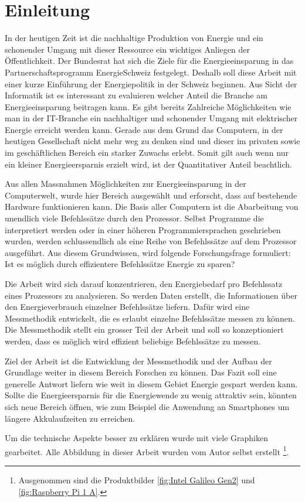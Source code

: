\chapter{Einleitung}


In der heutigen Zeit ist die nachhaltige Produktion von Energie und ein schonender Umgang mit dieser Ressource ein wichtiges Anliegen der Öffentlichkeit. Der Bundesrat hat sich die Ziele für die Energieeinsparung in das Partnerschaftsprogramm EnergieSchweiz festgelegt. Deshalb soll diese Arbeit mit einer kurze Einführung der Energiepolitik in der Schweiz beginnen. Aus Sicht der Informatik ist es interessant zu evaluieren welcher Anteil die Branche am Energieeinsparung beitragen kann. Es gibt bereits Zahlreiche Möglichkeiten wie man in der IT-Branche ein nachhaltiger und schonender Umgang mit elektrischer Energie erreicht werden kann. Gerade aus dem Grund das Computern, in der heutigen Gesellschaft nicht mehr weg zu denken sind und dieser im privaten sowie im geschäftlichen Bereich ein starker Zuwachs erlebt. Somit gilt auch wenn nur ein kleiner Energieersparnis erzielt wird, ist der Quantitativer Anteil beachtlich.
\par
Aus allen Massnahmen Möglichkeiten zur Energieeinsparung in der Computerwelt, wurde hier Bereich ausgewählt und erforscht, dass auf bestehende Hardware funktionieren kann. Die Basis aller Computern ist die Abarbeitung von unendlich viele Befehlssätze durch den Prozessor. Selbst Programme die interpretiert werden oder in einer höheren Programmiersprachen geschrieben wurden, werden schlussendlich als eine Reihe von Befehlssätze auf dem Prozessor ausgeführt. Aus diesem Grundwissen, wird folgende Forschungsfrage formuliert: Ist es möglich durch effizientere Befehlssätze Energie zu sparen?
\par
Die Arbeit wird sich darauf konzentrieren, den Energiebedarf pro Befehlssatz eines Prozessors zu analysieren. So werden Daten erstellt, die Informationen über den Energieverbrauch einzelner Befehlssätze liefern. Dafür wird eine Messmethodik entwickelt, die es erlaubt einzelne Befehlssätze messen zu können. Die Messmethodik stellt ein grosser Teil der Arbeit und soll so konzeptioniert werden, dass es möglich wird effizient beliebige Befehlssätze zu messen.
\par
Ziel der Arbeit ist die Entwicklung der Messmethodik und der Aufbau der Grundlage weiter in diesem Bereich Forschen zu können. Das Fazit soll eine generelle Antwort liefern wie weit in diesem Gebiet Energie gespart werden kann. Sollte die Energieersparnis für die Energiewende zu wenig attraktiv sein, könnten sich neue Bereich öffnen, wie zum Beispiel die Anwendung an Smartphones um längere Akkulaufzeiten zu erreichen.
\par
Um die technische Aspekte besser zu erklären wurde mit viele Graphiken gearbeitet. Alle Abbildung in dieser Arbeit wurden vom Autor selbst erstellt \footnote{Ausgenommen sind die Produktbilder \autoref{fig:Intel Galileo Gen2} und \ref{fig:Raspberry Pi 1 A}.}. 












